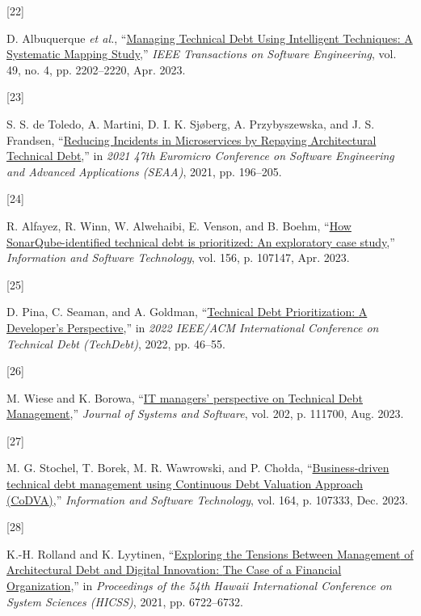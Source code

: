 \documentclass[
  journal,
]{IEEEtran}%
\newlength{\cslhangindent}
\newlength{\csllabelwidth}
\newenvironment{CSLReferences}[2] %
 {\begin{list}{}{%
  \setlength{\itemindent}{0pt}
  \setlength{\leftmargin}{0pt}
  \setlength{\parsep}{0pt}
  \ifodd #1
   \setlength{\leftmargin}{\cslhangindent}
   \setlength{\itemindent}{-1\cslhangindent}
  \fi
  \setlength{\itemsep}{#2\baselineskip}}}
 {\end{list}}
\newcommand{\CSLLeftMargin}[1]{\parbox[t]{\csllabelwidth}{\strut#1\strut}}
\newcommand{\CSLRightInline}[1]{\parbox[t]{\linewidth - \csllabelwidth}{\strut#1\strut}}
\begin{document}
\begin{CSLReferences}{0}{0}
\CSLLeftMargin{{[}22{]} }%
\CSLRightInline{D. Albuquerque \emph{et al.},
{``\href{https://doi.org/10.1109/TSE.2022.3214764}{Managing {Technical
Debt Using Intelligent Techniques}: {A Systematic Mapping Study}},''}
\emph{IEEE Transactions on Software Engineering}, vol. 49, no. 4, pp.
2202--2220, Apr. 2023. }

\CSLLeftMargin{{[}23{]} }%
\CSLRightInline{S. S. de Toledo, A. Martini, D. I. K. Sjøberg, A.
Przybyszewska, and J. S. Frandsen,
{``\href{https://doi.org/10.1109/SEAA53835.2021.00033}{Reducing
{Incidents} in {Microservices} by {Repaying Architectural Technical
Debt}},''} in \emph{2021 47th {Euromicro Conference} on {Software
Engineering} and {Advanced Applications} ({SEAA})}, 2021, pp. 196--205.
}

\CSLLeftMargin{{[}24{]} }%
\CSLRightInline{R. Alfayez, R. Winn, W. Alwehaibi, E. Venson, and B.
Boehm, {``\href{https://doi.org/10.1016/j.infsof.2023.107147}{How
{SonarQube-identified} technical debt is prioritized: {An} exploratory
case study},''} \emph{Information and Software Technology}, vol. 156, p.
107147, Apr. 2023. }

\CSLLeftMargin{{[}25{]} }%
\CSLRightInline{D. Pina, C. Seaman, and A. Goldman,
{``\href{https://doi.org/10.1145/3524843.3528096}{Technical {Debt
Prioritization}: {A Developer}'s {Perspective}},''} in \emph{2022
{IEEE}/{ACM International Conference} on {Technical Debt} ({TechDebt})},
2022, pp. 46--55. }

\CSLLeftMargin{{[}26{]} }%
\CSLRightInline{M. Wiese and K. Borowa,
{``\href{https://doi.org/10.1016/j.jss.2023.111700}{{IT} managers'
perspective on {Technical Debt Management}},''} \emph{Journal of Systems
and Software}, vol. 202, p. 111700, Aug. 2023. }

\CSLLeftMargin{{[}27{]} }%
\CSLRightInline{M. G. Stochel, T. Borek, M. R. Wawrowski, and P. Chołda,
{``\href{https://doi.org/10.1016/j.infsof.2023.107333}{Business-driven
technical debt management using {Continuous Debt Valuation Approach}
({CoDVA})},''} \emph{Information and Software Technology}, vol. 164, p.
107333, Dec. 2023. }

\CSLLeftMargin{{[}28{]} }%
\CSLRightInline{K.-H. Rolland and K. Lyytinen,
{``\href{https://doi.org/10.24251/HICSS.2021.807}{Exploring the
{Tensions Between Management} of {Architectural Debt} and {Digital
Innovation}: {The Case} of a {Financial Organization}},''} in
\emph{Proceedings of the 54th {Hawaii International Conference} on
{System Sciences} ({HICSS})}, 2021, pp. 6722--6732. }


\end{CSLReferences}
\end{document}
